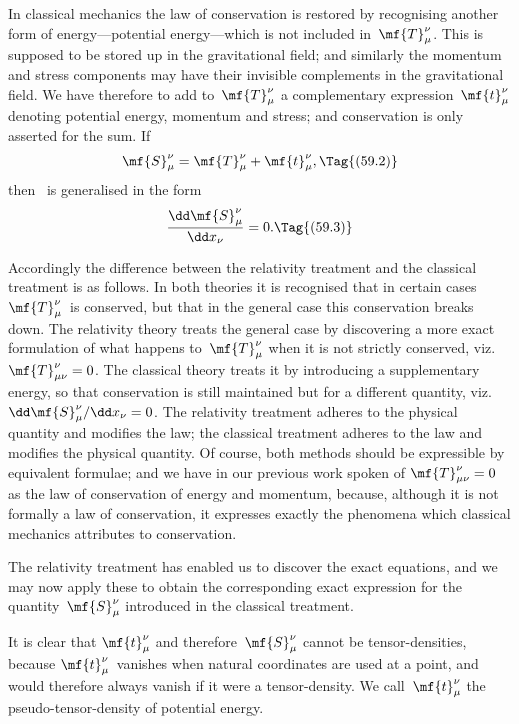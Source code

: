 \documentclass[12pt]{book}
\begin{document}
In classical mechanics the law of conservation is restored by recognising
%
%
another form of energy---potential energy---which is not included in~$\mf{T}_{\mu}^{\nu}$. This
is supposed to be stored up in the gravitational field; and similarly the momentum
and stress components may have their invisible complements in the
gravitational field. We have therefore to add to~$\mf{T}_{\mu}^{\nu}$ a complementary expression~$\mf{t}_{\mu}^{\nu}$
denoting potential energy, momentum and stress; and conservation is only
asserted for the sum. If
\[
\mf{S}_{\mu}^{\nu} = \mf{T}_{\mu}^{\nu} + \mf{t}_{\mu}^{\nu},
\Tag{(59.2)}
\]
then ~is generalised in the form
\[
\frac{\dd\mf{S}_{\mu}^{\nu}}{\dd x_{\nu}} = 0.
\Tag{(59.3)}
\]

Accordingly the difference between the relativity treatment and the
classical treatment is as follows. In both theories it is recognised that in
certain cases $\mf{T}_{\mu}^{\nu}$~is conserved, but that in the general case this conservation
breaks down. The relativity theory treats the general case by discovering a
more exact formulation of what happens to~$\mf{T}_{\mu}^{\nu}$ when it is not strictly conserved,
viz.\ $\mf{T}_{\mu\nu}^{\nu} = 0$. The classical theory treats it by introducing a supplementary
energy, so that conservation is still maintained but for a different quantity,
viz.\ $\dd\mf{S}_{\mu}^{\nu}/\dd x_{\nu} = 0$. The relativity treatment adheres to the physical quantity and
modifies the law; the classical treatment adheres to the law and modifies the
physical quantity. Of course, both methods should be expressible by equivalent
formulae; and we have in our previous work spoken of $\mf{T}_{\mu\nu}^{\nu} = 0$ as the law of
conservation of energy and momentum, because, although it is not formally
a law of conservation, it expresses exactly the phenomena which classical
mechanics attributes to conservation.

The relativity treatment has enabled us to discover the exact equations,
and we may now apply these to obtain the corresponding exact expression for
the quantity~$\mf{S}_{\mu}^{\nu}$ introduced in the classical treatment.

It is clear that $\mf{t}_{\mu}^{\nu}$ and therefore~$\mf{S}_{\mu}^{\nu}$ cannot be tensor\hyp{}densities, because $\mf{t}_{\mu}^{\nu}$~vanishes
%
when natural coordinates are used at a point, and would therefore
always vanish if it were a tensor\hyp{}density. We call~$\mf{t}_{\mu}^{\nu}$ the pseudo\hyp{}tensor\hyp{}density
of potential energy.
\end{document}
